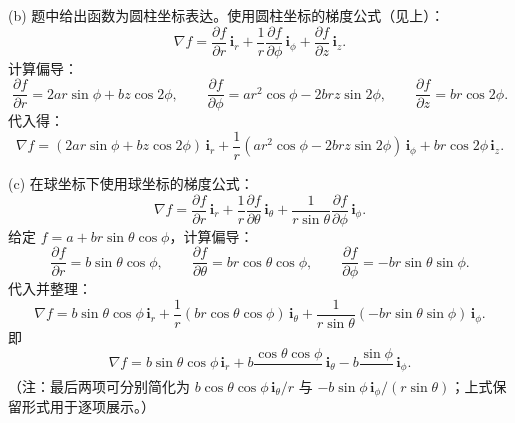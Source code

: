 (b) 题中给出函数为圆柱坐标表达。使用圆柱坐标的梯度公式（见上）：
\[
\nabla f=\frac{\partial f}{\partial r}\,\mathbf{i}_r+\frac{1}{r}\frac{\partial f}{\partial\phi}\,\mathbf{i}_\phi+\frac{\partial f}{\partial z}\,\mathbf{i}_z.
\]
计算偏导：
\[
\frac{\partial f}{\partial r}=2ar\sin\phi+b z\cos2\phi,
\qquad \frac{\partial f}{\partial\phi}=ar^2\cos\phi-2br z\sin2\phi,
\qquad \frac{\partial f}{\partial z}=br\cos2\phi.
\]
代入得：
\[
\nabla f=(2ar\sin\phi+b z\cos2\phi)\,\mathbf{i}_r+\frac{1}{r}(ar^2\cos\phi-2br z\sin2\phi)\,\mathbf{i}_\phi+br\cos2\phi\,\mathbf{i}_z.
\]

(c) 在球坐标下使用球坐标的梯度公式：
\[
\nabla f=\frac{\partial f}{\partial r}\,\mathbf{i}_r+\frac{1}{r}\frac{\partial f}{\partial\theta}\,\mathbf{i}_\theta+\frac{1}{r\sin\theta}\frac{\partial f}{\partial\phi}\,\mathbf{i}_\phi.
\]
给定 $f=a+br\sin\theta\cos\phi$，计算偏导：
\[
\frac{\partial f}{\partial r}=b\sin\theta\cos\phi,
\qquad \frac{\partial f}{\partial\theta}=br\cos\theta\cos\phi,
\qquad \frac{\partial f}{\partial\phi}=-br\sin\theta\sin\phi.
\]
代入并整理：
\[
\nabla f=b\sin\theta\cos\phi\,\mathbf{i}_r+\frac{1}{r}(br\cos\theta\cos\phi)\,\mathbf{i}_\theta+\frac{1}{r\sin\theta}(-br\sin\theta\sin\phi)\,\mathbf{i}_\phi.
\]
即
\[
\nabla f=b\sin\theta\cos\phi\,\mathbf{i}_r+b\frac{\cos\theta\cos\phi}{ }\,\mathbf{i}_\theta- b\frac{\sin\phi}{ }\,\mathbf{i}_\phi.
\]
（注：最后两项可分别简化为 $b\cos\theta\cos\phi\,\mathbf{i}_\theta/r$ 与 $-b\sin\phi\,\mathbf{i}_\phi/(r\sin\theta)$；上式保留形式用于逐项展示。）

